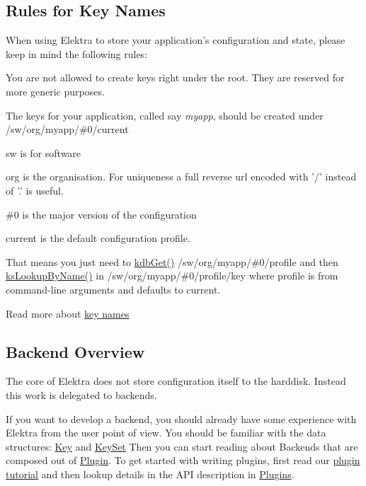 \subsection*{Rules for Key Names}

When using Elektra to store your application's configuration and state, please keep in mind the following rules\+:
\begin{DoxyItemize}
\item You are not allowed to create keys right under the root. They are reserved for more generic purposes.
\item The keys for your application, called say {\itshape myapp}, should be created under {\ttfamily /sw/org/myapp/\#0/current}
\begin{DoxyItemize}
\item sw is for software
\item org is the organisation. For uniqueness a full reverse url encoded with '/' instead of '.' is useful.
\item {\ttfamily \#0} is the major version of the configuration
\item current is the default configuration profile.
\item That means you just need to \hyperlink{group__kdb_ga28e385fd9cb7ccfe0b2f1ed2f62453a1}{kdb\+Get()} {\ttfamily /sw/org/myapp/\#0/profile} and then \hyperlink{group__keyset_gad2e30fb6d4739d917c5abb2ac2f9c1a1}{ks\+Lookup\+By\+Name()} in {\ttfamily /sw/org/myapp/\#0/profile/key} where profile is from command-\/line arguments and defaults to current.
\end{DoxyItemize}
\end{DoxyItemize}

Read more about \hyperlink{md_doc_help_elektra-key-names_doc_help_elektra-key-names_md}{key names}

\subsection*{Backend Overview}

The core of Elektra does not store configuration itself to the harddisk. Instead this work is delegated to backends.

If you want to develop a backend, you should already have some experience with Elektra from the user point of view. You should be familiar with the data structures\+: \hyperlink{group__key}{Key} and \hyperlink{group__keyset}{Key\+Set} Then you can start reading about Backends that are composed out of \hyperlink{group__plugin}{Plugin}. To get started with writing plugins, first read our \hyperlink{doc_tutorials_plugins_md}{plugin tutorial} and then lookup details in the A\+P\+I description in \hyperlink{group__plugin}{Plugins}.

